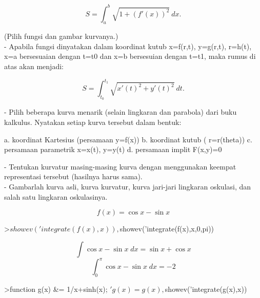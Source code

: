 \documentclass[a4paper,10pt]{article}
\begin{document}
\begin{eulernotebook}
\begin{eulercomment}
\end{eulercomment}
\begin{eulerformula}
\[
S = \int_a^b \sqrt{1+(f'(x))^2} \ dx.
\]
\end{eulerformula}
\begin{eulercomment}
(Pilih fungsi dan gambar kurvanya.)\\
- Apabila fungsi dinyatakan dalam koordinat kutub x=f(r,t), y=g(r,t),
r=h(t), x=a bersesuaian dengan t=t0 dan x=b bersesuian dengan t=t1,
maka rumus di atas akan menjadi:

\end{eulercomment}
\begin{eulerformula}
\[
S=\int_{t_0}^{t_1} \sqrt{x'(t)^2+y'(t)^2}\ dt.
\]
\end{eulerformula}
\begin{eulercomment}
- Pilih beberapa kurva menarik (selain lingkaran dan parabola) dari
buku  kalkulus. Nyatakan setiap kurva tersebut dalam bentuk:\\
\end{eulercomment}
\begin{eulerttcomment}
  a. koordinat Kartesius (persamaan y=f(x))
  b. koordinat kutub ( r=r(theta))
  c. persamaan parametrik x=x(t), y=y(t)
  d. persamaan implit F(x,y)=0
\end{eulerttcomment}
\begin{eulercomment}
- Tentukan kurvatur masing-masing kurva dengan menggunakan keempat
representasi tersebut (hasilnya harus sama).\\
- Gambarlah kurva asli, kurva kurvatur, kurva jari-jari lingkaran
oskulasi, dan salah satu lingkaran oskulasinya.
\end{eulercomment}
\begin{eulerformula}
\[
f\left(x\right)=\cos x-\sin x
\]
\end{eulerformula}
\begin{eulerprompt}
>$showev('integrate(f(x),x)), $showev('integrate(f(x),x,0,pi))
\end{eulerprompt}
\begin{eulerformula}
\[
\int {\cos x-\sin x}{\;dx}=\sin x+\cos x
\]
\[
\int_{0}^{\pi}{\cos x-\sin x\;dx}=-2
\]
\end{eulerformula}
\begin{eulerprompt}
>function g(x) &= 1/x+sinh(x); $'g(x)=g(x), $showev('integrate(g(x),x))

\end{eulerprompt}
\end{eulernotebook}
\end{document}
